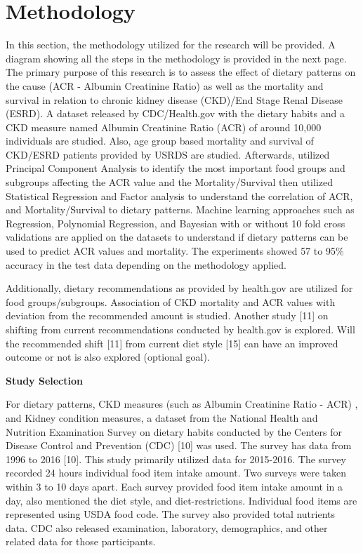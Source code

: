 \section{Methodology}
In this section, the methodology utilized for the research will be provided. A diagram showing all the steps in the methodology is provided in the next page. The primary purpose of this research is to assess the effect of dietary patterns on the cause (ACR - Albumin Creatinine Ratio) as well as the mortality and survival in relation to chronic kidney disease (CKD)/End Stage Renal Disease (ESRD). A dataset released by CDC/Health.gov with the dietary habits and a CKD measure named Albumin Creatinine Ratio (ACR) of around 10,000 individuals are studied. Also, age group based mortality and survival of CKD/ESRD patients provided by USRDS are studied. Afterwards, utilized Principal Component Analysis to identify the most important food groups and subgroups affecting the ACR value and the Mortality/Survival then utilized Statistical Regression and Factor analysis to understand the correlation of ACR, and Mortality/Survival to dietary patterns. Machine learning approaches such as Regression, Polynomial Regression, and Bayesian with or without 10 fold cross validations are applied on the datasets to understand if dietary patterns can be used to predict ACR values and mortality. The experiments showed 57 to 95\% accuracy in the test data depending on the methodology applied. 

\noindent Additionally, dietary recommendations as provided by health.gov are utilized for food groups/subgroups. Association of CKD mortality and ACR values with deviation from the recommended amount is studied. Another study [11] on shifting from current recommendations conducted by health.gov is explored. Will the recommended shift [11] from current diet style [15] can have an improved outcome or not is also explored (optional goal).

\noindent \textbf{Study Selection}

\medskip 

\noindent For dietary patterns, CKD measures (such as Albumin Creatinine Ratio - ACR) , and Kidney condition measures, a dataset from the National Health and Nutrition Examination Survey on dietary habits conducted by the Centers for Disease Control and Prevention (CDC) [10] was used. The survey has data from 1996 to 2016 [10]. This study primarily utilized data for 2015-2016. The survey recorded 24 hours individual food item intake amount. Two surveys were taken within 3 to 10 days apart. Each survey provided food item intake amount in a day, also mentioned the diet style, and diet-restrictions. Individual food items are represented using USDA food code. The survey also provided total nutrients data. CDC also released examination, laboratory, demographics, and other related data for those participants.

